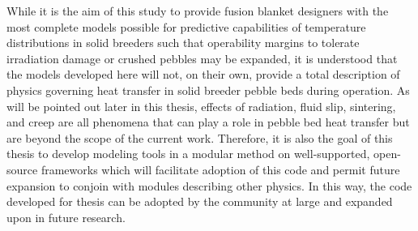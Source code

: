 While it is the aim of this study to provide fusion blanket designers with the most complete models possible for predictive capabilities of temperature distributions in solid breeders such that operability margins to tolerate irradiation damage or crushed pebbles may be expanded, it is understood that the models developed here will not, on their own, provide a total description of physics governing heat transfer in solid breeder pebble beds during operation. As will be pointed out later in this thesis, effects of radiation, fluid slip, sintering, and creep are all phenomena that can play a role in pebble bed heat transfer but are beyond the scope of the current work. Therefore, it is also the goal of this thesis to develop modeling tools in a modular method on well-supported, open-source frameworks which will facilitate adoption of this code and permit future expansion to conjoin with modules describing other physics. In this way, the code developed for thesis can be adopted by the community at large and expanded upon in future research.